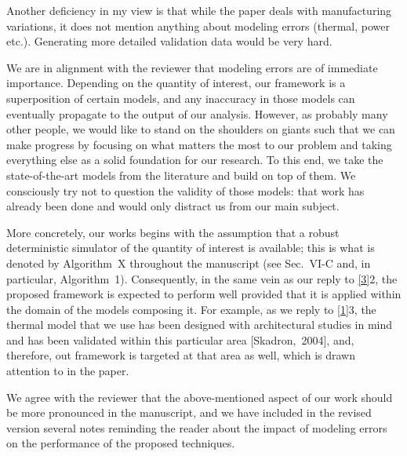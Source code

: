 \begin{reviewer}
Another deficiency in my view is that while the paper deals with manufacturing
variations, it does not mention anything about modeling errors (thermal, power
etc.). Generating more detailed validation data would be very hard.
\end{reviewer}

\begin{authors}
We are in alignment with the reviewer that modeling errors are of immediate
importance. Depending on the quantity of interest, our framework is a
superposition of certain models, and any inaccuracy in those models can
eventually propagate to the output of our analysis. However, as probably many
other people, we would like to stand on the shoulders on giants such that we can
make progress by focusing on what matters the most to our problem and taking
everything else as a solid foundation for our research. To this end, we take the
state-of-the-art models from the literature and build on top of them. We
consciously try not to question the validity of those models: that work has
already been done and would only distract us from our main subject.

More concretely, our works begins with the assumption that a robust
deterministic simulator of the quantity of interest is available; this is what
is denoted by Algorithm~X throughout the manuscript (see Sec.~VI-C and, in
particular, Algorithm~1). Consequently, in the same vein as our reply to
\cref{3}{2}, the proposed framework is expected to perform well provided that it
is applied within the domain of the models composing it. For example, as we
reply to \cref{1}{3}, the thermal model that we use has been designed with
architectural studies in mind and has been validated within this particular area
[Skadron,~2004], and, therefore, out framework is targeted at that area as well,
which is drawn attention to in the paper.

We agree with the reviewer that the above-mentioned aspect of our work should be
more pronounced in the manuscript, and we have included in the revised version
several notes reminding the reader about the impact of modeling errors on the
performance of the proposed techniques.

\begin{actions}
\end{actions}
\end{authors}

